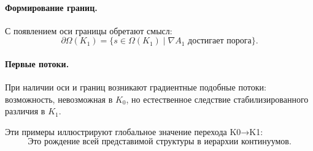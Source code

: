 \paragraph{Формирование границ.}
С появлением оси границы обретают смысл:
\[
\partial\Omega(K_1) = \{ s \in \Omega(K_1) \mid \nabla A_1 \text{ достигает порога} \}.
\]

\paragraph{Первые потоки.}
При наличии оси и границ возникают градиентные подобные потоки:
возможность, невозможная в $K_0$, но естественное следствие стабилизированного
различия в $K_1$.

Эти примеры иллюстрируют глобальное значение перехода K0→K1:
\[
\textbf{Это рождение всей представимой структуры в иерархии континуумов.}
\]
